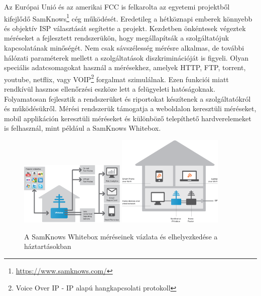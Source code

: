 Az Európai Unió és az amerikai FCC is felkarolta az egyetemi projektből kifejlődő SamKnows\footnote{\url{https://www.samknows.com/}} cég működését. Eredetileg a hétköznapi emberek könnyebb és objektív ISP választását segítette a projekt. Kezdetben önkéntesek végeztek méréseket a fejlesztett rendszerükön, hogy megállapítsák a szolgáltatójuk kapcsolatának minőségét. Nem csak sávszélesség mérésre alkalmas, de további hálózati paraméterek mellett a szolgáltatások diszkriminációját is figyeli. Olyan speciális adatcsomagokat használ a mérésekhez, amelyek HTTP, FTP, torrent, youtube, netflix, vagy VOIP\footnote{Voice Over IP - IP alapú hangkapcsolati protokoll} forgalmat szimulálnak. Ezen funkciói miatt rendkívül hasznos ellenőrzési eszköze lett a felügyeleti hatóságoknak. Folyamatosan fejlesztik a rendszerüket és riportokat készítenek a szolgáltatókról és működésükről.
Mérési rendszerük támogatja a weboldalon keresztüli méréseket, mobil applikáción keresztüli méréseket és különböző telepíthető hardverelemeket is felhasznál, mint például a SamKnows Whitebox.

\begin{figure}[!ht]
	\centering
	\includegraphics[width=0.45\textwidth, keepaspectratio]{figures/samknows-whitebox.png}
	\hspace{20pt}
	\includegraphics[width=0.45\textwidth, keepaspectratio]{figures/samknows-whitebox2.png}
		
	\caption{A SamKnows Whitebox méréseinek vázlata és elhelyezkedése a háztartásokban}
	\label{fig:samknows}
\end{figure}

